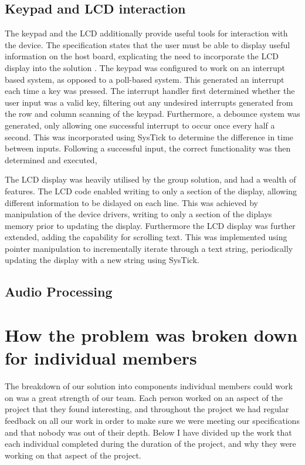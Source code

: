 \subsection*{Keypad and LCD interaction}

The keypad and the LCD additionally provide useful tools for interaction with 
the device. The specification states that the user must be able to display 
useful information on the host board, explicating the need to incorporate the 
LCD display into the solution \cite{specification}. 
The keypad was configured to work on an interrupt based system, as opposed to 
a poll-based system. This generated an interrupt each time a key was pressed. 
The interrupt handler first determined whether the user input was a valid key, 
filtering out any undesired interrupts generated from the row and column 
scanning of the keypad. 
Furthermore, a debounce system was generated, only allowing one successful 
interrupt to occur once every half a second. This was incorporated using SysTick
to determine the difference in time between inputs. 
Following a successful input, the correct functionality was then determined and 
executed, 
\par\bigskip\noindent
The LCD display was heavily utilised by the group solution, and had a wealth of 
features. 
The LCD code enabled writing to only a section of the display, allowing different 
information to be dislayed on each line. 
This was achieved by manipulation of the device drivers, writing to only a 
section of the diplays memory prior to updating the display. 
Furthermore the LCD display was further extended, adding the capability for 
scrolling text. 
This was implemented using pointer manipulation to incrementally iterate through 
a text string, periodically updating the display with a new string using SysTick.  

\subsection*{Audio Processing}



\section{How the problem was broken down for individual members}

The breakdown of our solution into components individual members could work on 
was a great strength of our team. Each person worked on an aspect of the project 
that they found interesting, and throughout the project we had regular feedback 
on all our work in order to make sure we were meeting our specifications and 
that nobody was out of their depth. Below I have divided up the work that each 
individual completed during the duration of the project, and why they were 
working on that aspect of the project. 


